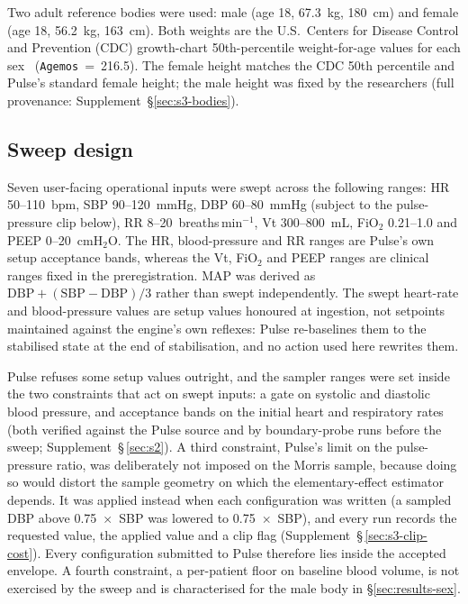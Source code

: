 \documentclass[pdflatex,sn-nature]{sn-jnl}%
\begin{document}
Two adult reference bodies were used: male (age 18, 67.3~kg, 180~cm) and female (age 18, 56.2~kg, 163~cm). Both weights are the U.S.\ Centers for Disease Control and Prevention (CDC) growth-chart 50th-percentile weight-for-age values for each sex~\cite{kuczmarski2002cdc} (\texttt{Agemos}~=~216.5). The female height matches the CDC 50th percentile and Pulse's standard female height; the male height was fixed by the researchers (full provenance: Supplement~\S\ref{sec:s3-bodies}).

\subsection{Sweep design}\label{sec:methods-sweep}

Seven user-facing operational inputs were swept across the following ranges: HR 50--110~bpm, SBP 90--120~mmHg, DBP 60--80~mmHg (subject to the pulse-pressure clip below), RR 8--20~breaths\,min$^{-1}$, Vt 300--800~mL, FiO$_2$ 0.21--1.0 and PEEP 0--20~cmH$_2$O. The HR, blood-pressure and RR ranges are Pulse's own setup acceptance bands, whereas the Vt, FiO$_2$ and PEEP ranges are clinical ranges fixed in the preregistration. MAP was derived as $\mathrm{DBP} + (\mathrm{SBP} - \mathrm{DBP})/3$ rather than swept independently. The swept heart-rate and blood-pressure values are setup values honoured at ingestion, not setpoints maintained against the engine's own reflexes: Pulse re-baselines them to the stabilised state at the end of stabilisation, and no action used here rewrites them.

Pulse refuses some setup values outright, and the sampler ranges were set inside the two constraints that act on swept inputs: a gate on systolic and diastolic blood pressure, and acceptance bands on the initial heart and respiratory rates (both verified against the Pulse source and by boundary-probe runs before the sweep; Supplement~\S\,\ref{sec:s2}). A third constraint, Pulse's limit on the pulse-pressure ratio, was deliberately not imposed on the Morris sample, because doing so would distort the sample geometry on which the elementary-effect estimator depends. It was applied instead when each configuration was written (a sampled DBP above 0.75~$\times$~SBP was lowered to 0.75~$\times$~SBP), and every run records the requested value, the applied value and a clip flag (Supplement~\S\,\ref{sec:s3-clip-cost}). Every configuration submitted to Pulse therefore lies inside the accepted envelope. A fourth constraint, a per-patient floor on baseline blood volume, is not exercised by the sweep and is characterised for the male body in \S\ref{sec:results-sex}.
\end{document}
